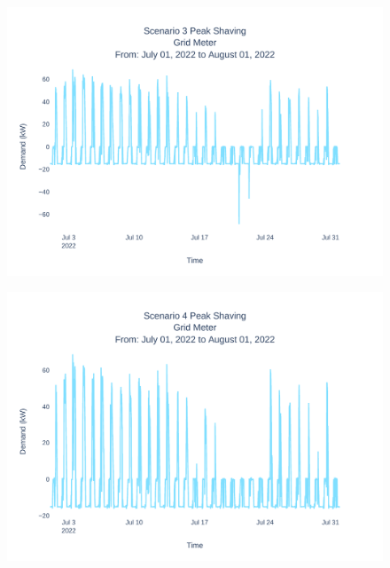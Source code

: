 \documentclass[conference]{IEEEtran}
\begin{document}
	
	\begin{figure}[H]
		\centering
		\includegraphics[width=1\linewidth]{Fig/scenario_3_peak_shaving}
		\caption{}
		\label{fig:scenario3peakshaving}
	\end{figure}
	
	\begin{figure}[H]
		\centering
		\includegraphics[width=1\linewidth]{Fig/scenario_4_peak_shaving}
		\caption{}
		\label{fig:scenario4peakshaving}
	\end{figure}
\end{document}
